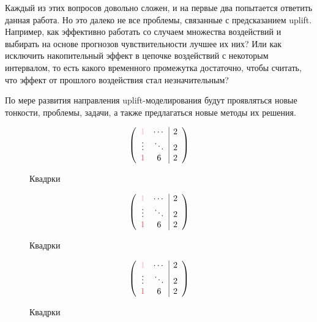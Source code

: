 Каждый из этих вопросов довольно сложен, и на первые два попытается ответить данная работа. Но это далеко не все проблемы, связанные с предсказанием uplift. Например, как эффективно работать со случаем множества воздействий и выбирать на основе прогнозов чувствительности лучшее их них? Или как исключить накопительный эффект в цепочке воздействий с некоторым интервалом, то есть какого временного промежутка достаточно, чтобы считать, что эффект от прошлого воздействия стал незначительным?

По мере развития направления uplift-моделирования будут проявляться новые тонкости, проблемы, задачи, а также предлагаться новые методы их решения.










\iffalse

\begin{figure}[ht]
  \centering
$$
\left(
\begin{array}{cc|c}
\color{red!30}{1} & \cdots & 2 \\ 
\vdots & \ddots & 2 \\
\color{red!70}{1} & 6 & 2 \\ 
\end{array}
\right)
$$
\caption{Квадрки}
\label{fig:quadr}
\endminipage
{}
  \centering
$$
\left(
\begin{array}{cc|c}
\color{red!30}{1} & \cdots & 2 \\ 
\vdots & \ddots & 2 \\
\color{red!70}{1} & 6 & 2 \\ 
\end{array}
\right)
$$
\caption{Квадрки}
\label{fig:quadr}
\endminipage
\end{figure}













\begin{figure}[ht]
  \centering
$$
\left(
\begin{array}{cc|c}
\color{red!30}{1} & \cdots & 2 \\ 
\vdots & \ddots & 2 \\
\color{red!70}{1} & 6 & 2 \\ 
\end{array}
\right)
$$
\caption{Квадрки}
\label{fig:quadr}
\endminipage
\end{figure}












